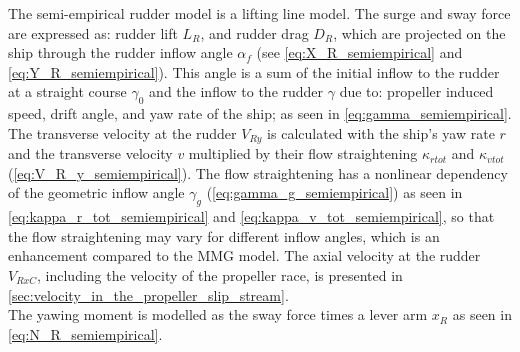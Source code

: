 The semi-empirical rudder model is a lifting line model. The surge and sway force are expressed as: rudder lift $L_R$, and rudder drag $D_R$, which are projected on the ship through the rudder inflow angle $\alpha_f$ (see \autoref{eq:X_R_semiempirical} and \autoref{eq:Y_R_semiempirical}).
This angle is a sum of the initial inflow to the rudder at a straight course $\gamma_0$ and the inflow to the rudder $\gamma$ due to: propeller induced speed, drift angle, and yaw rate of the ship; as seen in \autoref{eq:gamma_semiempirical}.
\begin{equation}
    \label{eq:X_R_semiempirical}
    
\end{equation}
%
\begin{equation}
    \label{eq:Y_R_semiempirical}
    
\end{equation}
%
\begin{equation}
    \label{eq:alpha_f_semiempirical}
    
\end{equation}
%
\begin{equation}
    \label{eq:gamma_semiempirical}
    
\end{equation}
The transverse velocity at the rudder $V_{Ry}$ is calculated with the ship's yaw rate $r$ and the transverse velocity $v$ multiplied by their flow straightening $\kappa_{rtot}$ and $\kappa_{vtot}$ (\autoref{eq:V_R_y_semiempirical}). The flow straightening has a nonlinear dependency of the geometric inflow angle $\gamma_g$ (\autoref{eq:gamma_g_semiempirical}) as seen in \autoref{eq:kappa_r_tot_semiempirical} and \autoref{eq:kappa_v_tot_semiempirical}, so that the flow straightening may vary for different inflow angles, which is an enhancement compared to the MMG model.
The axial velocity at the rudder $V_{RxC}$, including the velocity of the propeller race, is presented in \autoref{sec:velocity_in_the_propeller_slip_stream}.
\begin{equation}
    \label{eq:V_R_y_semiempirical}
    
\end{equation}
%
\begin{equation}
    \label{eq:kappa_r_tot_semiempirical}
    
\end{equation}
%
\begin{equation}
    \label{eq:kappa_v_tot_semiempirical}
    
\end{equation}
%
\begin{equation}
    \label{eq:gamma_g_semiempirical}
    
\end{equation}
The yawing moment is modelled as the sway force times a lever arm $x_R$ as seen in \autoref{eq:N_R_semiempirical}.
\begin{equation}
    \label{eq:N_R_semiempirical}
    
\end{equation}
%
%
